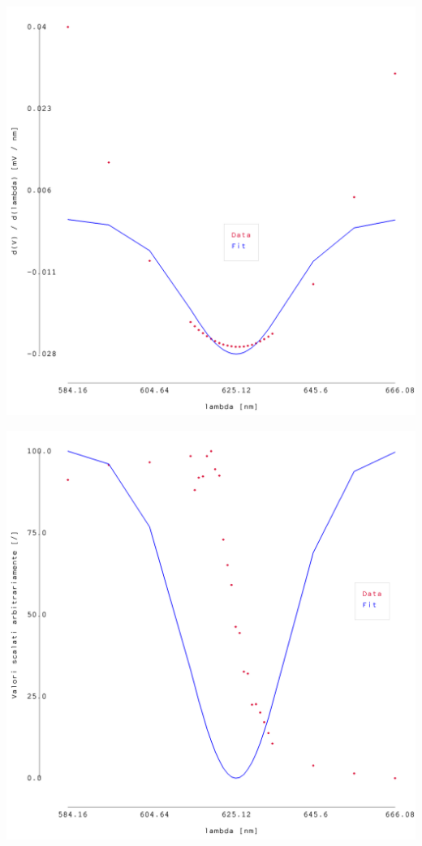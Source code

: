 \documentclass{article}
\begin{document}
\begin{center}
    \begin{minipage}{0.25\textwidth}        
        \includegraphics[width=1\linewidth]{../images/grafico1_4.png}
    \end{minipage}
    \hfill
    \begin{minipage}{0.25\textwidth}        
        \includegraphics[width=1\linewidth]{../images/grafico3_4.png}

\end{minipage}
\end{center}
\end{document}
